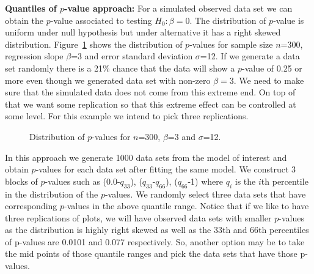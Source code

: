 \documentclass[11pt]{article}
\begin{document}
{\bf Quantiles of $p$-value approach:} For a simulated observed data set we can obtain the $p$-value associated to testing $H_0: \beta=0$. The distribution of $p$-value is uniform under null hypothesis but under alternative it has a right skewed distribution. Figure~\ref{fig:dist_pvalue} shows the distribution  of $p$-values for sample size $n$=300, regression slope $\beta$=3 and error standard deviation $\sigma$=12. If we generate a data set randomly there is a 21\% chance that the data will show a $p$-value of 0.25 or more even though we generated data set with non-zero $\beta=3$. We need to make sure that the simulated data does not come from this extreme end. On top of that we want some replication so that this extreme effect can be controlled at some level. For this example we intend to pick three replications.


\begin{figure}[hbtp]
   \centering
       \caption{Distribution of $p$-values for $n$=300, $\beta$=3 and $\sigma$=12.}
       \label{fig:dist_pvalue}
\end{figure}

In this approach we generate 1000 data sets from the model of interest and obtain $p$-values for each data set after fitting the same model. We construct 3 blocks of $p$-values such as (0.0-$q_{33}$), ($q_{33}$-$q_{66}$), ($q_{66}$-1) where $q_i$ is the $i$th percentile in the distribution of the $p$-values. We randomly select three data sets that have corresponding $p$-values in the above quantile range.  Notice that if we like to have three replications of plots, we will have observed data sets with smaller $p$-values as the distribution is highly right skewed as well as the 33th and 66th percentiles of p-values are 0.0101 and 0.077 respectively. So, another option may be to take the mid points of those quantile ranges and pick the data sets that have those p-values. \\
\end{document}

